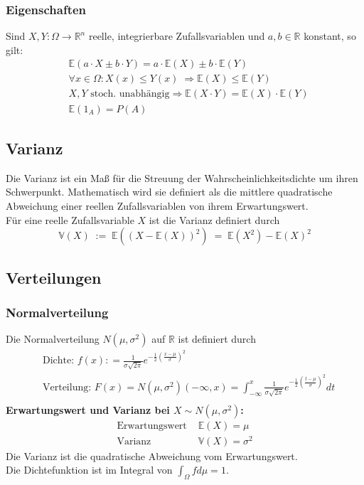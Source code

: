 \documentclass[a4paper]{article}
\begin{document}
\subsubsection{Eigenschaften}
Sind $X,Y : \Omega \to \mathbb{R}^n$   reelle, integrierbare  Zufallsvariablen und $a,b \in \mathbb{R}$ konstant, so gilt:
\begin{align*}
& \mathbb{E}(a \cdot X \pm b \cdot Y) = a \cdot \mathbb{E}(X) \pm b \cdot \mathbb{E}(Y) \\
& \forall x \in \Omega: X(x) \leq Y(x) \;   \Rightarrow \mathbb{E}(X) \leq \mathbb{E}(Y) \\
& X ,Y \text{ stoch. unabhängig} \Rightarrow   \mathbb{E}(X \cdot Y) =  \mathbb{E}(X) \cdot  \mathbb{E}(Y) \\
& \mathbb{E} (1_A) = P (A)
\end{align*}

\subsection{Varianz}
Die Varianz ist ein Maß für die Streuung der Wahrscheinlichkeitsdichte um ihren Schwerpunkt. Mathematisch wird sie definiert als die mittlere quadratische Abweichung einer reellen Zufallsvariablen von ihrem Erwartungswert.\\

Für eine reelle Zufallsvariable $X$ ist die Varianz definiert durch
$$ \mathbb{V} (X) \; := \;  \mathbb{E}( (X - \mathbb{E}(X))^2) \;  = \; \mathbb{E}(X^2) -  \mathbb{E}(X)^2$$

\pagebreak
\subsection{Verteilungen}

\subsubsection{Normalverteilung}
Die Normalverteilung $N{(\mu,\sigma^2)}$ auf $\mathbb{R}$ ist definiert durch
\begin{align*}
& \text{Dichte: } f (x) : = \frac 1{\sigma \sqrt{2\pi}}e^{- \frac {1}{2} (\frac{x- \mu}{ \sigma})^2} \\
&  \text{Verteilung: } F(x) = N{(\mu,\sigma^2)}(-\infty , x) =  \int_{-\infty}^{x}  \frac 1{\sigma \sqrt{2\pi}}e^{- \frac {1}{2} (\frac{t- \mu}{ \sigma})^2}dt\\
\end{align*}
\textbf{Erwartungswert und Varianz bei $X \sim N(\mu, \sigma^2)$:}
\begin{align*}
\text{Erwartungswert } & \mathbb{E}(X) = \mu \\
\text{Varianz }& \mathbb{V}(X) = \sigma^2
\end{align*}
Die Varianz ist die quadratische Abweichung vom Erwartungswert. \\
Die Dichtefunktion ist im Integral von $\int_{\Omega} f d \mu = 1$.
\end{document}
